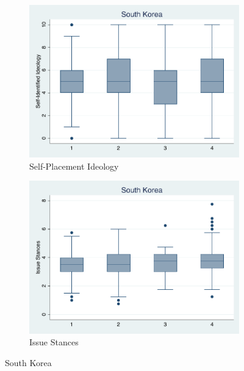 \documentclass[12pt, titlepage]{article}
\begin{document}
\begin{figure}[H]
	\centering
	\begin{subfigure}[b]{0.475\textwidth}   
		\centering 
		\includegraphics[width=\textwidth]{IdeoBP/SouthKorea}
		\caption{Self-Placement Ideology}
	\end{subfigure}
	\hfill
	\begin{subfigure}[b]{0.475\textwidth}
		\centering 
		\includegraphics[width=\textwidth]{BoxLib/SKorea}
		\caption{Issue Stances}
	\end{subfigure}
	\caption{South Korea}
	\label{SouthKorea}
\end{figure}
\end{document}
